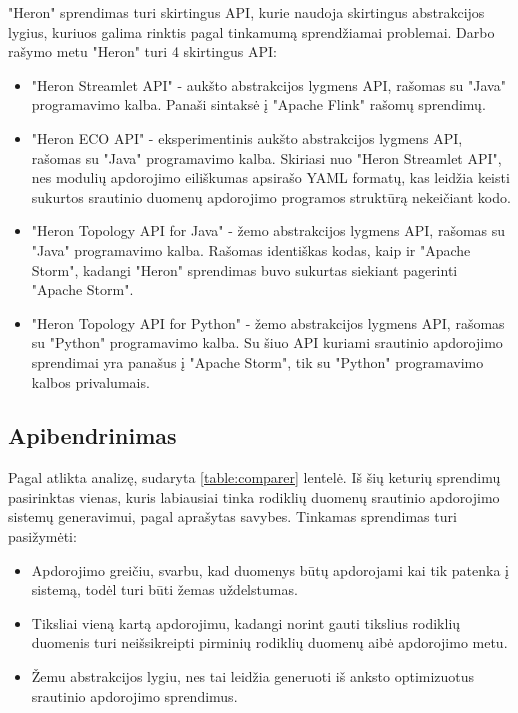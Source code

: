 \documentclass{VUMIFPSbakalaurinis}
\begin{document}
"Heron" sprendimas turi skirtingus API, kurie naudoja skirtingus abstrakcijos lygius, kuriuos galima rinktis pagal tinkamumą sprendžiamai problemai. Darbo rašymo metu "Heron" turi 4 skirtingus API:
\begin{itemize}
    \item "Heron Streamlet API" - aukšto abstrakcijos lygmens API, rašomas su "Java" programavimo kalba. Panaši sintaksė į "Apache Flink" rašomų sprendimų.
    \item "Heron ECO API" - eksperimentinis aukšto abstrakcijos lygmens API, rašomas su "Java" programavimo kalba. Skiriasi nuo "Heron Streamlet API", nes modulių apdorojimo eiliškumas apsirašo YAML formatų, kas leidžia keisti sukurtos srautinio duomenų apdorojimo programos struktūrą nekeičiant kodo.
    \item "Heron Topology API for Java" - žemo abstrakcijos lygmens API, rašomas su "Java" programavimo kalba. Rašomas identiškas kodas, kaip ir "Apache Storm", kadangi "Heron" sprendimas buvo sukurtas siekiant pagerinti "Apache Storm".
    \item "Heron Topology API for Python" - žemo abstrakcijos lygmens API, rašomas su "Python" programavimo kalba. Su šiuo API kuriami srautinio apdorojimo sprendimai yra panašus į "Apache Storm", tik su "Python" programavimo kalbos privalumais.
\end{itemize}  


\subsection{Apibendrinimas}

Pagal atlikta analizę, sudaryta \ref{table:comparer} lentelė. Iš šių keturių sprendimų pasirinktas vienas, kuris labiausiai tinka rodiklių duomenų srautinio apdorojimo sistemų generavimui, pagal aprašytas savybes. Tinkamas sprendimas turi pasižymėti: 
\begin{itemize}
    \item Apdorojimo greičiu, svarbu, kad duomenys būtų apdorojami kai tik patenka į sistemą, todėl turi būti žemas uždelstumas.
    \item Tiksliai vieną kartą apdorojimu, kadangi norint gauti tikslius rodiklių duomenis turi neišsikreipti pirminių rodiklių duomenų aibė apdorojimo metu.
    \item Žemu abstrakcijos lygiu, nes tai leidžia generuoti iš anksto optimizuotus srautinio apdorojimo sprendimus.  
\end{itemize} 
\end{document}

